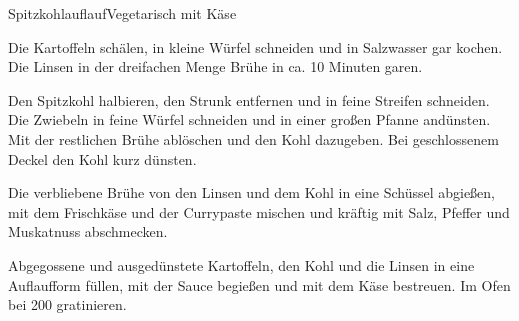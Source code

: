 \begin{recipe}{Spitzkohlauflauf}{Vegetarisch mit Käse}
  \label{Spitzkohlauflauf}
  \inglist
 
  \steps
  Die Kartoffeln schälen, in kleine Würfel schneiden und in Salzwasser gar
  kochen. Die Linsen in der dreifachen Menge Brühe in ca. 10 Minuten garen.

  Den Spitzkohl halbieren, den Strunk entfernen und in feine Streifen schneiden.
  Die Zwiebeln in feine Würfel schneiden und in einer großen Pfanne andünsten. Mit
  der restlichen Brühe ablöschen und den Kohl dazugeben. Bei geschlossenem Deckel
  den Kohl kurz dünsten.

  Die verbliebene Brühe von den Linsen und dem Kohl in eine Schüssel abgießen,
  mit dem Frischkäse und der Currypaste mischen und kräftig mit Salz, Pfeffer
  und Muskatnuss abschmecken.

  Abgegossene und ausgedünstete Kartoffeln, den Kohl und die Linsen in eine
  Auflaufform füllen, mit der Sauce begießen und mit dem Käse bestreuen. Im Ofen
  bei 200 \celsius gratinieren.

\end{recipe}
